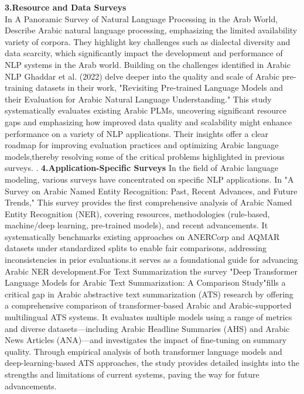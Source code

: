 \documentclass[runningheads]{llncs}
\begin{document}
\textbf{3.Resource and Data Surveys} \\
In A Panoramic Survey of Natural Language Processing in the Arab World,\cite{Darwish2021} Describe Arabic natural language processing, emphasizing the limited availability variety of corpora. They highlight key challenges such as dialectal diversity and data scarcity, which significantly impact the development and performance of NLP systems in the Arab world.
Building on the challenges identified in Arabic NLP Ghaddar et al. (2022) delve deeper into the quality and scale of Arabic pre-training datasets in their work, "Revisiting Pre-trained Language Models and their Evaluation for Arabic Natural Language Understanding."\cite{ref_proc15} This study systematically evaluates existing Arabic PLMs, uncovering significant resource gaps and emphasizing how improved data quality and scalability might enhance performance on a variety of NLP applications. Their insights offer a clear roadmap for improving evaluation practices and optimizing Arabic language models,thereby resolving some of the critical problems highlighted in previous surveys. . \newline
\textbf{4.Application-Specific Surveys} \newline
In the field of Arabic language modeling, various surveys have concentrated on specific NLP applications. In "A Survey on Arabic Named Entity Recognition: Past, Recent Advances, and Future Trends," \cite{qu2023}This survey provides the first comprehensive analysis of Arabic Named Entity Recognition (NER), covering resources, methodologies (rule-based, machine/deep learning, pre-trained models), and recent advancements. It systematically benchmarks existing approaches on ANERCorp and AQMAR datasets under standardized splits to enable fair comparisons, addressing inconsistencies in prior evaluations.it serves as a foundational guide for advancing Arabic NER development.For Text Summarization the survey "Deep Transformer Language Models for Arabic Text Summarization: A Comparison Study"\cite{couikhi2022}fills a critical gap in Arabic abstractive text summarization (ATS) research by offering a comprehensive comparison of transformer-based Arabic and Arabic-supported multilingual ATS systems. It evaluates multiple models using a range of metrics and diverse datasets—including Arabic Headline Summaries (AHS) and Arabic News Articles (ANA)—and investigates the impact of fine-tuning on summary quality. Through empirical analysis of both transformer language models and deep-learning-based ATS approaches, the study provides detailed insights into the strengths and limitations of current systems, paving the way for future advancements.
\end{document}
